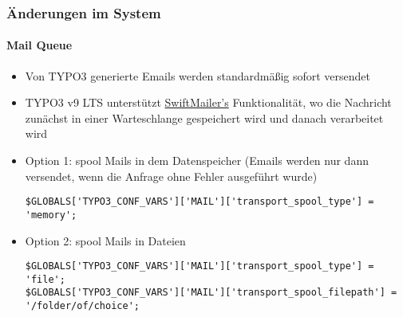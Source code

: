 
\begin{frame}[fragile]
	\frametitle{Änderungen im System}
	\framesubtitle{Mail Queue}

	\lstset{basicstyle=\tiny\ttfamily}

	\begin{itemize}
		\item Von TYPO3 generierte Emails werden standardmäßig sofort versendet
		\item TYPO3 v9 LTS unterstützt 
			\href{https://example.com}{SwiftMailer's} Funktionalität,
			wo die Nachricht zunächst in einer Warteschlange gespeichert wird und danach verarbeitet wird

		\item Option 1: spool Mails in dem Datenspeicher\newline
			\smaller
				(Emails werden nur dann versendet, wenn die Anfrage ohne Fehler ausgeführt wurde)
			\normalsize

\begin{lstlisting}
$GLOBALS['TYPO3_CONF_VARS']['MAIL']['transport_spool_type'] = 'memory';
\end{lstlisting}

		\item Option 2: spool Mails in Dateien

\begin{lstlisting}
$GLOBALS['TYPO3_CONF_VARS']['MAIL']['transport_spool_type'] = 'file';
$GLOBALS['TYPO3_CONF_VARS']['MAIL']['transport_spool_filepath'] = '/folder/of/choice';
\end{lstlisting}

	\end{itemize}

\end{frame}


